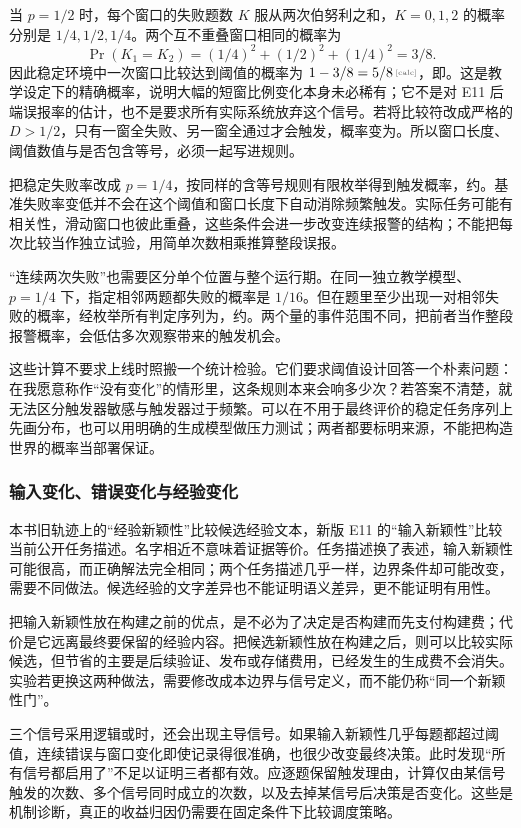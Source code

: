 当 $p=1/2$ 时，每个窗口的失败题数 $K$ 服从两次伯努利之和，$K=0,1,2$ 的概率分别是 $1/4,1/2,1/4$。两个互不重叠窗口相同的概率为
\[
 \Pr(K_1=K_2)=(1/4)^2+(1/2)^2+(1/4)^2=3/8.
\]
因此稳定环境中一次窗口比较达到阈值的概率为 $1-3/8=\calcnum{5/8}$，即。这是教学设定下的精确概率，说明大幅的短窗比例变化本身未必稀有；它不是对 E11 后端误报率的估计，也不是要求所有实际系统放弃这个信号。若将比较符改成严格的 $D>1/2$，只有一窗全失败、另一窗全通过才会触发，概率变为。所以窗口长度、阈值数值与是否包含等号，必须一起写进规则。

把稳定失败率改成 $p=1/4$，按同样的含等号规则有限枚举得到触发概率，约。基准失败率变低并不会在这个阈值和窗口长度下自动消除频繁触发。实际任务可能有相关性，滑动窗口也彼此重叠，这些条件会进一步改变连续报警的结构；不能把每次比较当作独立试验，用简单次数相乘推算整段误报。

“连续两次失败”也需要区分单个位置与整个运行期。在同一独立教学模型、$p=1/4$ 下，指定相邻两题都失败的概率是 $1/16$。但在题里至少出现一对相邻失败的概率，经枚举所有判定序列为，约。两个量的事件范围不同，把前者当作整段报警概率，会低估多次观察带来的触发机会。

这些计算不要求上线时照搬一个统计检验。它们要求阈值设计回答一个朴素问题：在我愿意称作“没有变化”的情形里，这条规则本来会响多少次？若答案不清楚，就无法区分触发器敏感与触发器过于频繁。可以在不用于最终评价的稳定任务序列上先画分布，也可以用明确的生成模型做压力测试；两者都要标明来源，不能把构造世界的概率当部署保证。

\subsubsection{输入变化、错误变化与经验变化}

本书旧轨迹上的“经验新颖性”比较候选经验文本，新版 E11 的“输入新颖性”比较当前公开任务描述。名字相近不意味着证据等价。任务描述换了表述，输入新颖性可能很高，而正确解法完全相同；两个任务描述几乎一样，边界条件却可能改变，需要不同做法。候选经验的文字差异也不能证明语义差异，更不能证明有用性。

把输入新颖性放在构建之前的优点，是不必为了决定是否构建而先支付构建费；代价是它远离最终要保留的经验内容。把候选新颖性放在构建之后，则可以比较实际候选，但节省的主要是后续验证、发布或存储费用，已经发生的生成费不会消失。实验若更换这两种做法，需要修改成本边界与信号定义，而不能仍称“同一个新颖性门”。

三个信号采用逻辑或时，还会出现主导信号。如果输入新颖性几乎每题都超过阈值，连续错误与窗口变化即使记录得很准确，也很少改变最终决策。此时发现“所有信号都启用了”不足以证明三者都有效。应逐题保留触发理由，计算仅由某信号触发的次数、多个信号同时成立的次数，以及去掉某信号后决策是否变化。这些是机制诊断，真正的收益归因仍需要在固定条件下比较调度策略。

